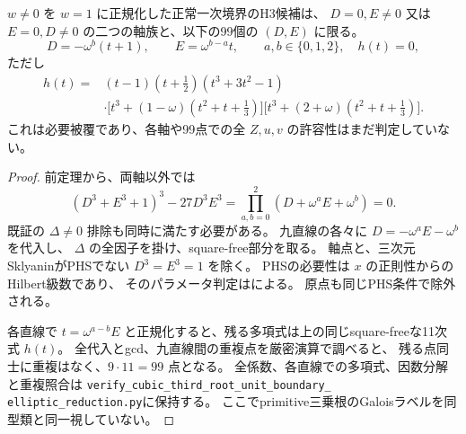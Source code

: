 \begin{corollary}
\label{cor:cubic-third-root-unit-boundary-99}
$w\ne0$ を $w=1$ に正規化した正常一次境界のH3候補は、
$D=0,E\ne0$ 又は $E=0,D\ne0$ の二つの軸族と、以下の99個の $(D,E)$ に限る。
\[
 D=-\omega^b(t+1),\qquad E=\omega^{b-a}t,
 \qquad a,b\in\{0,1,2\},\quad h(t)=0,
\]
ただし
\begin{align*}
 h(t)={}&(t-1)(t+\tfrac12)(t^3+3t^2-1)\\
 &\cdot\bigl[t^3+(1-\omega)(t^2+t+\tfrac13)\bigr]
       \bigl[t^3+(2+\omega)(t^2+t+\tfrac13)\bigr].
\end{align*}
これは必要被覆であり、各軸や99点での全 $Z,u,v$ の許容性はまだ判定していない。
\end{corollary}
\begin{proof}
前定理から、両軸以外では
\[
 (D^3+E^3+1)^3-27D^3E^3
  =\prod_{a,b=0}^2(D+\omega^aE+\omega^b)=0.
\]
既証の $\Delta\ne0$ 排除も同時に満たす必要がある。
九直線の各々に $D=-\omega^aE-\omega^b$ を代入し、
$\Delta$ の全因子を掛け、square-free部分を取る。
軸点と、三次元SklyaninがPHSでない $D^3=E^3=1$ を除く。
PHSの必要性は $x$ の正則性からのHilbert級数であり、
そのパラメータ判定は\cite[Theorem~1.1]{ISSklyanin}による。
原点も同じPHS条件で除外される。

各直線で $t=\omega^{a-b}E$ と正規化すると、残る多項式は上の同じsquare-freeな11次式 $h(t)$。
全代入とgcd、九直線間の重複点を厳密演算で調べると、
残る点同士に重複はなく、$9\cdot11=99$ 点となる。
全係数、各直線での多項式、因数分解と重複照合は
\texttt{verify\_cubic\_third\_root\_unit\_boundary\_}\allowbreak
\texttt{elliptic\_reduction.py}に保持する。
ここでprimitive三乗根のGaloisラベルを同型類と同一視していない。
\end{proof}

